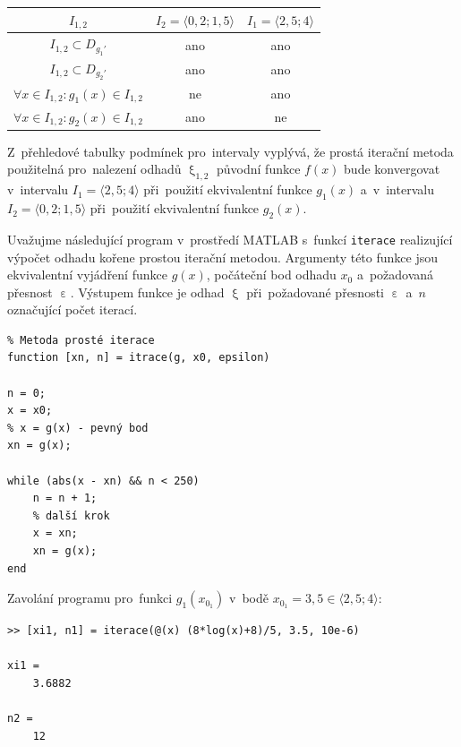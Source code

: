 \documentclass[a4paper,10pt]{article}
\begin{document}
\begin{center}
  \begin{tabular}{|c|c|c|}
    \hline
    $I_{1,2}$ & $I_2=\langle{0,2}; 1,5\rangle$ & $I_1=\langle{2,5}; 4\rangle$ \\ \hline\hline
    
    $I_{1,2}{\subset} D_{g_1'}$ & ano & ano \\ \hline
    $I_{1,2}{\subset} D_{g_2'}$ & ano & ano \\ \hline
    
    ${\forall}x{\in}I_{1,2}: g_1\left(x\right){\in} I_{1,2}$ & ne & ano \\ \hline
    ${\forall}x{\in}I_{1,2}: g_2\left(x\right){\in} I_{1,2}$ & ano & ne \\ 
    
    \hline
  \end{tabular}
\end{center}

Z~přehledové tabulky podmínek pro~intervaly vyplývá, že prostá iterační metoda použitelná
pro~nalezení odhadů $\upxi_{1,2}$ původní funkce $f(x)$ bude konvergovat v~intervalu
$I_1=\langle{2,5}; 4\rangle$ při~použití ekvivalentní funkce $g_1(x)$ a~v~intervalu
$I_2=\langle{0,2}; 1,5\rangle$ při~použití ekvivalentní funkce $g_2(x)$.

\par Uvažujme následující program v~prostředí MATLAB s~funkcí \texttt{iterace} realizující
výpočet odhadu kořene prostou iterační metodou. Argumenty této funkce jsou ekvivalentní
vyjádření funkce $g\left(x\right)$, počáteční bod odhadu $x_0$ a~požadovaná přesnost
$\upepsilon$. Výstupem funkce je odhad $\upxi$ při~požadované přesnosti $\upepsilon$
a~$n$ označující
počet iterací.

\begin{verbatim}
% Metoda prosté iterace
function [xn, n] = itrace(g, x0, epsilon)

n = 0;
x = x0;
% x = g(x) - pevný bod
xn = g(x);

while (abs(x - xn) && n < 250)
    n = n + 1;
    % další krok
    x = xn;
    xn = g(x);
end
\end{verbatim}

\newpage
\par Zavolání programu pro~funkci $g_1\left(x_{0_1}\right)$ v~bodě
$x_{0_1}=3,5 {\in} \langle{2,5}; 4\rangle$:

\begin{verbatim}
>> [xi1, n1] = iterace(@(x) (8*log(x)+8)/5, 3.5, 10e-6)

xi1 =
    3.6882
    
n2 =
    12
\end{verbatim}
\end{document}
